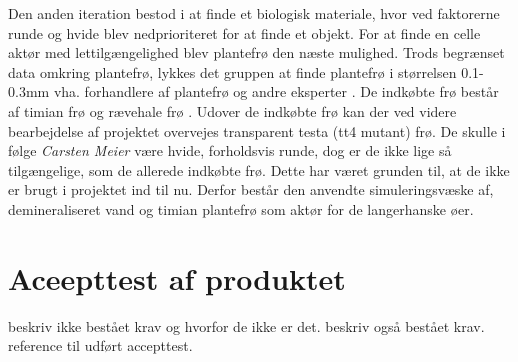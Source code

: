 Den anden iteration bestod i at finde et biologisk materiale, hvor ved faktorerne runde og hvide blev nedprioriteret for at finde et objekt. For at finde en celle aktør med lettilgængelighed blev plantefrø den næste mulighed. Trods begrænset data omkring plantefrø, lykkes det gruppen at finde plantefrø i størrelsen 0.1-0.3mm vha. forhandlere af plantefrø og andre eksperter . De indkøbte frø består af timian frø og rævehale frø . Udover de indkøbte frø kan der ved videre bearbejdelse af projektet overvejes transparent testa (tt4 mutant) frø. De skulle i følge \textit{Carsten Meier} være hvide, forholdsvis runde, dog er de ikke lige så tilgængelige, som de allerede indkøbte frø. Dette har været grunden til, at de ikke er brugt i projektet ind til nu. Derfor består den anvendte simuleringsvæske af, demineraliseret vand og timian plantefrø som aktør for de langerhanske øer.  
 
\section{Aceepttest af produktet} 
 beskriv ikke bestået krav og hvorfor de ikke er det. beskriv også bestået krav. reference til udført accepttest.
